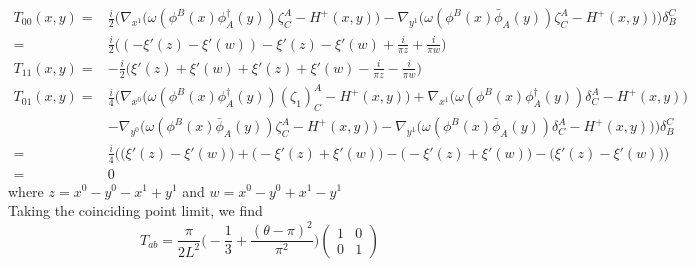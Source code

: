 \begin{equation}
\begin{split}
T_{00}(x,y) = 
& \frac{i}{2}\Big(\nabla_{x^1} \big( \omega(\phi^B(x) \phi^\dagger_A(y))\zeta^A_C - H^+(x,y) \big)
- \nabla_{y^1} \big( \omega( \phi^B(x) \bar{\phi}_A(y))\zeta^A_C - H^+(x,y) \big)
\Big)\delta_B^C  \\
= & \frac{i}{2} \big( (-\xi'(z) - \xi'(w)) - \xi'(z) - \xi'(w) + \frac{i}{\pi z} + \frac{i}{\pi w} \big)   \\
T_{11}(x,y) =
& - \frac{i}{2}\big( \xi'(z) + \xi'(w) + \xi'(z) + \xi'(w) - \frac{i}{\pi z} - \frac{i}{\pi w}\big) \\
T_{01}(x,y) = 
& \frac{i}{4}\Big(\nabla_{x^0} \big( \omega(\phi^B(x) \phi^\dagger_A(y))(\zeta_1)^A_C - H^+(x,y) \big) + \nabla_{x^1} \big( \omega(\phi^B(x) \phi^\dagger_A(y))\delta^A_C - H^+(x,y) \big)  \\
& - \nabla_{y^0} \big( \omega( \phi^B(x) \bar{\phi}_A(y))\zeta^A_C - H^+(x,y) \big)
- \nabla_{y^1} \big( \omega( \phi^B(x) \bar{\phi}_A(y))\delta^A_C - H^+(x,y) \big)
\Big)\delta_B^C \\
= & \frac{i}{4}\Big( \big( \xi'(z) - \xi'(w) \big) + \big(- \xi'(z) + \xi'(w) \big) - \big( - \xi'(z) + \xi'(w) \big) - \big( \xi'(z) - \xi'(w) \big) \Big) \\
= & 0
\end{split}
\end{equation}
where $z = x^0 - y^0 - x^1 + y^1$ and $w = x^0 - y^0 + x^1 - y^1$ \\
Taking the coinciding point limit, we find
\begin{equation}
T_{ab} = \frac{ \pi}{2 L^2} \big( -\frac{1}{3} + \frac{(\theta - \pi)^2}{\pi^2}\big)\begin{pmatrix}
1  & 0 \\ 0  &  1
\end{pmatrix}
\end{equation}

